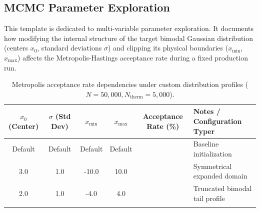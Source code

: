 \documentclass{article}
\begin{document}
\subsection{MCMC Parameter Exploration}
This template is dedicated to multi-variable parameter exploration. It documents how modifying the internal structure of the target bimodal Gaussian distribution (centers $x_0$, standard deviations $\sigma$) and clipping its physical boundaries ($x_{\min}$, $x_{\max}$) affects the Metropolis-Hastings acceptance rate during a fixed production run.

\begin{table}[htbp]
\centering
\caption{Metropolis acceptance rate dependencies under custom distribution profiles ($N = 50,000, N_{\text{therm}} = 5,000$).}
\label{tab:parameter_exploration}
\begin{tabular}{cccccl}
\toprule
$x_0$ (Center) & $\sigma$ (Std Dev) & $x_{\min}$ & $x_{\max}$ & Acceptance Rate (\%) & Notes / Configuration Typer \\
\midrule
Default & Default & Default & Default & & Baseline initialization \\
3.0     & 1.0     & -10.0   & 10.0    & & Symmetrical expanded domain \\
2.0     & 1.0     & -4.0    & 4.0     & & Truncated bimodal tail profile \\
        &         &         &         & & \\
\bottomrule
\end{tabular}
\end{table}
\end{document}
